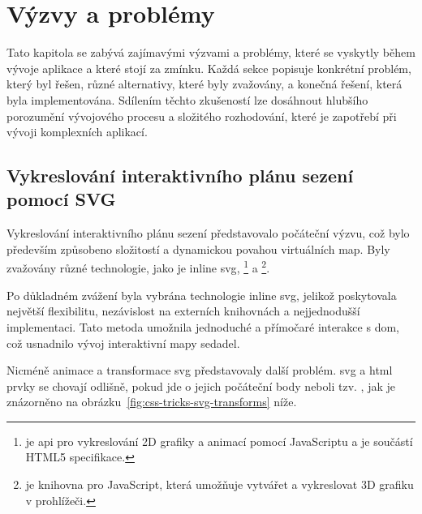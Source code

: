 \chapter{Výzvy a problémy}
\label{ch:vyzvy-a-problemy}
Tato kapitola se zabývá zajímavými výzvami a problémy, které se vyskytly během vývoje aplikace a které stojí za zmínku.
Každá sekce popisuje konkrétní problém, který byl řešen, různé alternativy, které byly zvažovány, a konečná řešení, která byla implementována.
Sdílením těchto zkušeností lze dosáhnout hlubšího porozumění vývojového procesu a složitého rozhodování, které je zapotřebí při vývoji komplexních aplikací.



\section{Vykreslování interaktivního plánu sezení pomocí SVG}
\label{sec:vyzvy-a-problemy-rendering-sedadel}
Vykreslování interaktivního plánu sezení představovalo počáteční výzvu, což bylo především způsobeno složitostí a dynamickou povahou virtuálních map.
Byly zvažovány různé technologie, jako je inline \ac{svg}, \footnote{ je \ac{api} pro vykreslování 2D grafiky a animací pomocí JavaScriptu a je součástí HTML5 specifikace\cite{mdn_api_canvas_api}.} a \footnote{ je knihovna pro JavaScript, která umožňuje vytvářet a vykreslovat 3D grafiku v prohlížeči\cite{mdn_games_techniques_3d_on_the_web_building_up_a_basic_demo_with_three_js}.}.

Po důkladném zvážení byla vybrána technologie inline \ac{svg}, jelikož poskytovala největší flexibilitu, nezávislost na externích knihovnách a nejjednodušší implementaci\cite{s_blog_seating_plan_rendering}.
Tato metoda umožnila jednoduché a přímočaré interakce s \ac{dom}, což usnadnilo vývoj interaktivní mapy sedadel.

Nicméně animace a transformace \ac{svg} představovaly další problém.
\ac{svg} a \ac{html} prvky se chovají odlišně, pokud jde o jejich počáteční body neboli tzv. , jak je znázorněno na obrázku~\ref{fig:css-tricks-svg-transforms} níže.

